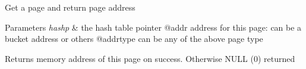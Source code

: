 Get a page and return page address


\begin{DoxyParams}{Parameters}
{\em hashp} & the hash table pointer @addr address for this page\+: can be a bucket address or others @addrtype can be any of the above page type\\
\hline
\end{DoxyParams}
\begin{DoxyReturn}{Returns}
memory address of this page on success. Otherwise N\+U\+LL (0) returned 
\end{DoxyReturn}

